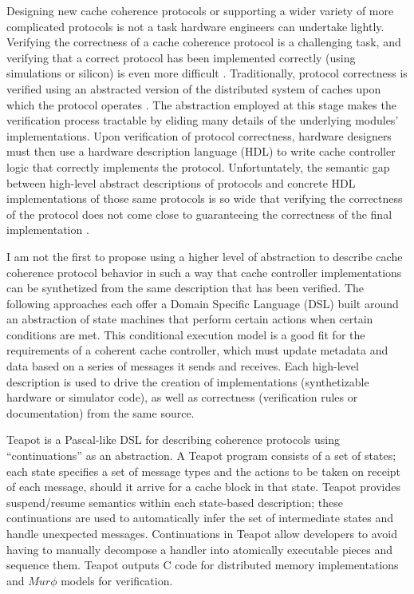 Designing new cache coherence protocols or supporting a wider variety of more complicated protocols is not a task hardware engineers can undertake lightly.
Verifying the correctness of a cache coherence protocol is a challenging task, and
verifying that a correct protocol has been implemented correctly (using simulations or silicon) is even more difficult
\cite{deorio2008post, bentley2001validating, burckhardt2005verifying, clarke1995verification, dill1992protocol, wood1990verifying}.
Traditionally, protocol correctness is verified using an abstracted version of the distributed system of caches upon which the protocol operates
\cite{talupur2008going, delzanno2003constraint, pong1997verification, wood1990verifying, mcmillan2001parameterized}.
The abstraction employed at this stage makes the verification process tractable by eliding many details of the underlying modules' implementations.
Upon verification of protocol correctness, hardware designers must then use a hardware description language (HDL) to write cache controller logic that correctly implements the protocol.
Unfortuntately, the semantic gap between high-level abstract descriptions of protocols and 
concrete HDL implementations of those same protocols is so wide that verifying the correctness of the protocol
does not come close to guaranteeing the correctness of the final implementation \cite{dave-memocode05}.

I am not the first to propose using a higher level of abstraction to describe cache coherence protocol behavior
in such a way that cache controller implementations can be synthetized from the same description that has been verified.
The following approaches each offer a Domain Specific Language (DSL)
built around an abstraction of state machines that perform certain actions when certain conditions are met.
This conditional execution model is a good fit for the requirements of a coherent cache controller,
which must update metadata and data based on a series of messages it sends and receives.
Each high-level description is used to drive the creation of implementations (synthetizable hardware or simulator code),
as well as correctness (verification rules or documentation) from the same source.

Teapot \cite{chandra-dsl97, chandra-sigplan96}
is a Pascal-like DSL for describing coherence protocols using ``continuations'' as an abstraction.
A Teapot program consists of a set of states; each state
specifies a set of message types and the actions to be
taken on receipt of each message, should it arrive for a
cache block in that state.
Teapot provides suspend/resume semantics within each state-based description;
these continuations are used to automatically infer the set of intermediate states and handle unexpected messages.
Continuations in Teapot allow developers to avoid having to manually decompose
a handler into atomically executable pieces and sequence them. 
Teapot outputs C code for distributed memory implementations and $Mur\phi$ models for verification.

